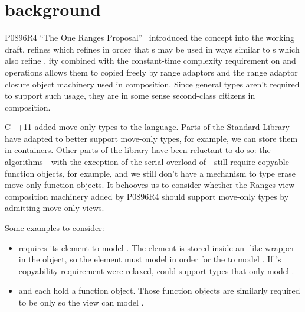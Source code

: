 \section{background}
P0896R4 ``The One Ranges Proposal''~\cite{p0896} introduced the 
concept into the \Cpp working draft.  refines 
which refines  in order that s may be used in ways
similar to s which also refine .
ity combined with the constant-time complexity requirement on
 and  operations allows them to copied freely by
range adaptors and the range adaptor closure object machinery used in
 composition. Since general  types aren't required to
support such usage, they are in some sense second-class citizens in 
composition.

C++11 added move-only types to the language. Parts of the Standard Library have
adapted to better support move-only types, for example, we can store them in
containers. Other parts of the library have been reluctant to do so: the
algorithms
- with the exception of the serial overload of  -
still require copyable function objects, for example, and we still don't have a
mechanism to type erase move-only function objects. It behooves us to consider
whether the Ranges view composition machinery added by P0896R4 should support
move-only types by admitting move-only views.

Some examples to consider:
\begin{itemize}
\item {} requires its element to model
  . The element is stored inside an
  -like wrapper in the  object, so the
  element must model  in order for the
   to model . If 's
  copyability requirement were relaxed,  could support types
  that only model .
\item {} and  each hold a function object.
  Those function objects are similarly required to be 
  only so the view can model .
\end{itemize}

